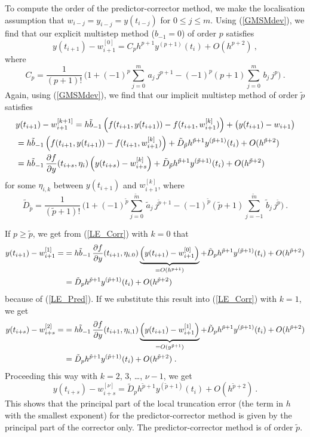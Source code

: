 To compute the order of the predictor-corrector method,
we make the localisation assumption that
$w_{i-j} = y_{i-j} = y(t_{i-j})$ for $0\leq j \leq m$.
Using (\ref{GMSMdev}), we find that our explicit multistep method
($b_{-1} =0$) of order $p$ satisfies
\begin{equation} \label{LE_Pred}
y(t_{i+1}) - w_{i+1}^{[0]} = C_p h^{p+1} y^{(p+1)}(t_i) + O(h^{p+2})
\ ,
\end{equation}
where
\[
C_p = \frac{1}{(p+1)!}\,\bigg( 1 + (-1)^p \sum_{j=0}^m\,a_j\,j^{p+1}
- (-1)^p (p+1) \sum_{j=0}^m\,b_j\, j^p\bigg) \ .
\]
Again, using (\ref{GMSMdev}), we find that our implicit multistep
method of order $\tilde{p}$ satisfies
\begin{align}
&y(t_{i+1}) - w_{i+1}^{[k+1]}
= h \tilde{b}_{-1} \left( f(t_{i+1},y(t_{i+1})) - f(t_{i+1},w_{i+1}^{[k]}) \right)
+ \big( y(t_{i+1}) - w_{i+1} \big) \nonumber \\
&=h \tilde{b}_{-1} \left( f(t_{i+1},y(t_{i+1})) - f(t_{i+1},w_{i+1}^{[k]}) \right)
+ \tilde{D}_{\tilde{p}} h^{\tilde{p}+1} y^{(\tilde{p}+1)}(t_i) +
O(h^{\tilde{p}+2}) \nonumber \\
&= h \tilde{b}_{-1} \,\frac{\partial{f}}{\partial{y}}(t_{i+s},\eta_i)
\left( y(t_{i+s}) - w_{i+s}^{[k]} \right)
+ \tilde{D}_{\tilde{p}} h^{\tilde{p}+1} y^{(\tilde{p}+1)}(t_i) + O(h^{\tilde{p}+2})
\label{LE_Corr} 
\end{align}
for some $\eta_{i,k}$ between $y(t_{i+1})$ and $w_{i+1}^{[k]}$, where
\[
\tilde{D}_{\tilde{p}} = \frac{1}{(\tilde{p}+1)!}\,\bigg( 1
+ (-1)^{\tilde{p}} \sum_{j=0}^{\tilde{m}}\,\tilde{a}_j\,j^{\tilde{p}+1}
- (-1)^{\tilde{p}} (\tilde{p}+1) \sum_{j=-1}^{\tilde{m}}\,\tilde{b}_j\,
j^{\tilde{p}}\bigg) \ .
\]

If $p \geq \tilde{p}$, we get from (\ref{LE_Corr}) with $k=0$ that
\begin{align*}
y(t_{i+1}) - w_{i+1}^{[1]} =
&= h \tilde{b}_{-1} \,\frac{\partial{f}}{\partial{y}}(t_{i+1},\eta_{i.0})
\underbrace{\left( y(t_{i+1}) - w_{i+1}^{[0]} \right)}_{=O(h^{p+1})}
+ \tilde{D}_p h^{\tilde{p}+1} y^{(\tilde{p}+1)}(t_i) +
O(h^{\tilde{p}+2}) \\
&= \tilde{D}_p h^{\tilde{p}+1} y^{(\tilde{p}+1)}(t_i) +
O(h^{\tilde{p}+2})
\end{align*}
because of (\ref{LE_Pred}).  If we substitute this result into
(\ref{LE_Corr}) with $k=1$, we get
\begin{align*}
y(t_{i+s}) - w_{i+s}^{[2]} =
&= h \tilde{b}_{-1} \,\frac{\partial{f}}{\partial{y}}(t_{i+1},\eta_{i,1})
\underbrace{\left( y(t_{i+1}) - w_{i+1}^{[1]} \right)}_{=O(y^{\tilde{p}+1})}
+ \tilde{D}_p h^{\tilde{p}+1} y^{(\tilde{p}+1)}(t_i) +
O(h^{\tilde{p}+2}) \\
&= \tilde{D}_p h^{\tilde{p}+1} y^{(\tilde{p}+1)}(t_i) +
O(h^{\tilde{p}+2}) \; .
\end{align*}
Proceeding this way with $k=2$, $3$, \ldots, $\nu-1$, we get
\[
y(t_{i+s}) - w_{i+s}^{[\nu]}
= \tilde{D}_p h^{\tilde{p}+1} y^{(\tilde{p}+1)}(t_i) +
O(h^{\tilde{p}+2}) \ .
\]
This shows that the principal part of the local truncation error (the
term in $h$ with the smallest exponent) for the predictor-corrector
method is given by the principal part of the corrector only.  The 
predictor-corrector method is of order $\tilde{p}$.

